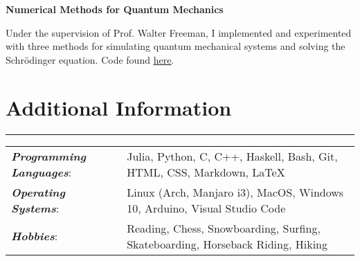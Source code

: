 \documentclass[9pt]{extarticle}
\newcommand{\myline}{\rule[\baselineskip]{\linewidth}{1pt}}
\begin{document}
\vspace{2.5pt}
\large\textbf{Numerical Methods for Quantum Mechanics}
\normalsize

\begin{compactitem}
\item Under the supervision of Prof. Walter Freeman, I implemented and experimented with three methods for simulating quantum mechanical systems and solving the Schr\"odinger equation. Code found \href{https://github.com/aarontrowbridge/Quantum}{\underline{here}}. 
\end{compactitem}



\section{Additional Information}
\myline

\normalsize

\begin{tabular}{ll}
\textbf{\textit{Programming Languages}}: & Julia, Python, C, C++,  Haskell, Bash, Git, HTML, CSS, Markdown, \LaTeX \\
\textbf{\textit{Operating Systems}}: & Linux (Arch, Manjaro i3), MacOS, Windows 10, Arduino, Visual Studio Code \\ 
\textbf{\textit{Hobbies}}: & Reading, Chess, Snowboarding, Surfing, Skateboarding, Horseback Riding, Hiking \\    
\end{tabular}
\end{document}
